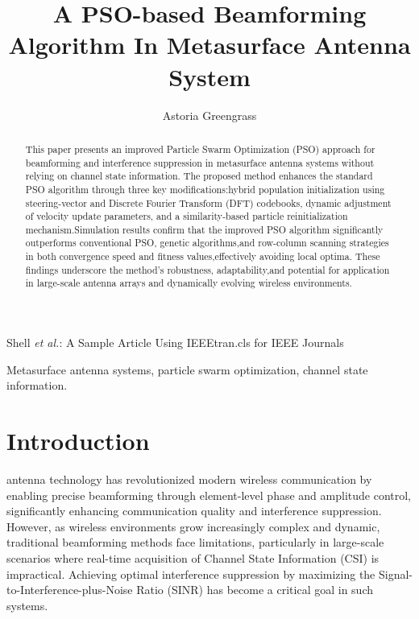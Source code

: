 \documentclass[lettersize,journal]{IEEEtran}
\begin{document}
\title{A PSO-based Beamforming Algorithm In Metasurface Antenna System}

\author{Astoria Greengrass}

%
{Shell \MakeLowercase{\textit{et al.}}: A Sample Article Using IEEEtran.cls for IEEE Journals}


\maketitle

\begin{abstract}
  This paper presents an improved Particle Swarm Optimization (PSO) approach for beamforming and interference suppression in metasurface antenna systems without relying on channel state information. The proposed method enhances the standard PSO algorithm through three key modifications:hybrid population initialization using steering-vector and Discrete Fourier Transform (DFT) codebooks, dynamic adjustment of velocity update parameters, and a similarity-based particle reinitialization mechanism.Simulation results confirm that the improved PSO algorithm significantly outperforms conventional PSO, genetic algorithms,and row-column scanning strategies in both convergence speed and fitness values,effectively avoiding local optima. These findings underscore the method's robustness, adaptability,and potential for application in large-scale antenna arrays and dynamically evolving wireless environments.
\end{abstract}

\begin{IEEEkeywords}
  Metasurface antenna systems, particle swarm optimization, channel state information.
\end{IEEEkeywords}

\section{Introduction}
 antenna technology has revolutionized modern wireless communication by enabling precise beamforming through element-level phase and amplitude control, significantly enhancing communication quality and interference suppression\cite{faenzi_metasurface_2019}. However, as wireless environments grow increasingly complex and dynamic, traditional beamforming methods face limitations, particularly in large-scale scenarios where real-time acquisition of Channel State Information (CSI) is impractical. Achieving optimal interference suppression by maximizing the Signal-to-Interference-plus-Noise Ratio (SINR) has become a critical goal in such systems.
\end{document}

